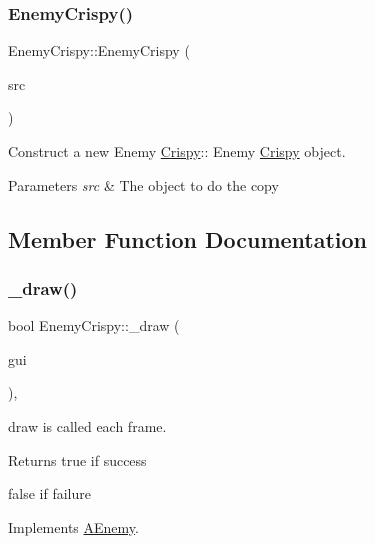 \subsubsection{\texorpdfstring{Enemy\+Crispy()}{EnemyCrispy()}\hspace{0.1cm}{\footnotesize\ttfamily [2/2]}}
{\footnotesize\ttfamily Enemy\+Crispy\+::\+Enemy\+Crispy (\begin{DoxyParamCaption}\item[{\hyperlink{class_enemy_crispy}{Enemy\+Crispy} const \&}]{src }\end{DoxyParamCaption})}



Construct a new Enemy \hyperlink{class_crispy}{Crispy}\+:\+: Enemy \hyperlink{class_crispy}{Crispy} object. 


\begin{DoxyParams}{Parameters}
{\em src} & The object to do the copy \\
\hline
\end{DoxyParams}


\subsection{Member Function Documentation}
\mbox{\label{class_enemy_crispy_a82cd9389ee451c2ca4e71ff86989e870}} 
\subsubsection{\texorpdfstring{\+\_\+draw()}{\_draw()}}
{\footnotesize\ttfamily bool Enemy\+Crispy\+::\+\_\+draw (\begin{DoxyParamCaption}\item[{\hyperlink{class_gui}{Gui} \&}]{gui }\end{DoxyParamCaption})\hspace{0.3cm}{\ttfamily [protected]}, {\ttfamily [virtual]}}



draw is called each frame. 

\begin{DoxyReturn}{Returns}
true if success 

false if failure 
\end{DoxyReturn}


Implements \hyperlink{class_a_enemy_a70e3638b5ed8ecea2a087ffe16510dd2}{A\+Enemy}.

